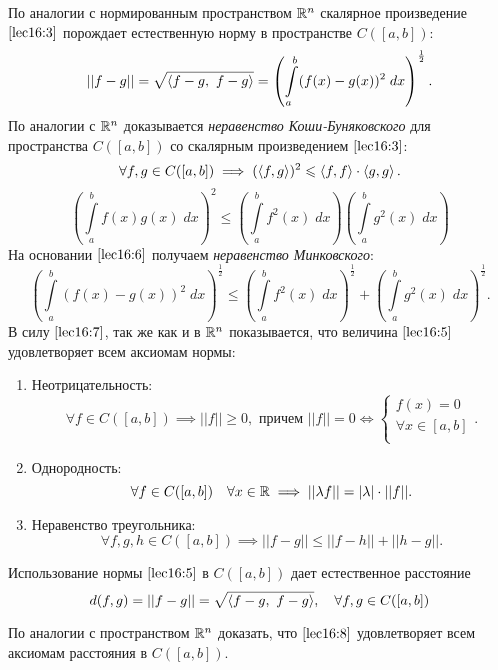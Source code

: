 \documentclass[../../main.tex]{subfiles}
\begin{document}
	 По аналогии с нормированным пространством $\mathbb{R}^n$ скалярное произведение
	  $\eqref{lec16:3}$ порождает естественную норму в пространстве $C(\left[a,
	   b\right])$:
	 \begin{equation}
	 \label{lec16:5}
	 ||f - g|| = \sqrt{\left\langle f - g,\ f - g \right\rangle} = \left(\int \limits_a^b (f(x) - 
	 g(x))^2
	  \; dx\right)^\frac{1}{2}.
	 \end{equation}
	 По аналогии с $\mathbb{R}^n$ доказывается \emph{неравенство Коши-Буняковского} для 
	 пространства
	  $C(\left[a, b\right])$ со скалярным произведением $\eqref{lec16:3}$:
	 \[ \forall f, g \in C(\left[a, b\right]) \implies (\left\langle f, g \right\rangle)^2 \leqslant 
	 \left\langle f, f \right\rangle\cdot \left\langle g, g \right\rangle.\]
	 \begin{equation}
	\label{lec16:6}
	 \left(\int\limits_a^bf(x)g(x)\; dx\right)^2 \le \left(\int \limits_a^b
	  f^2(x)\; dx\right)\left(\int \limits_a^b g^2(x)\; dx\right) 
	 \end{equation}
	 На основании $\eqref{lec16:6}$ получаем \emph{неравенство Минковского}:
	 \begin{equation}
	 \label{lec16:7}
	  \left(\int\limits_a^b(f(x) - g(x))^2\; dx\right)^\frac{1}{2} \le \left(\int
	   \limits_a^b f^2(x)\; dx\right)^\frac{1}{2} + \left(\int \limits_a^b 
	   g^2(x)\; dx\right) ^ \frac{1}{2}.
	 \end{equation}
	 В силу $\eqref{lec16:7}$, так же как и в $\mathbb{R}^n$ показывается, что величина
	  $\eqref{lec16:5}$ удовлетворяет всем аксиомам нормы:
	 \begin{enumerate}
	 \item Неотрицательность:
	 \[\forall f \in C(\left[a, b\right]) \implies ||f|| \geq 0, \text{ причем } 
	 ||f|| = 0 \iff \begin{cases}
	 f(x) = 0\\\forall x \in \left[a, b\right]\\
	 \end{cases}.\]
	 	\item Однородность:
	 \[\forall f \in C(\left[a, b\right]) \quad \forall x \in \mathbb{R} \implies 
	 ||\lambda
	  f|| = |\lambda| \cdot ||f||.\]
	 \item Неравенство треугольника:
	 \[\forall f, g, h \in C(\left[a, b\right]) \implies ||f - g|| \leq ||f - h||
	 + ||h - g||.\]
	 	\end{enumerate}
	 Использование нормы $\eqref{lec16:5}$ в $C(\left[a, b\right])$ дает 
	 естественное расстояние
	 \begin{equation}
	 \label{lec16:8}
	 d(f, g) = ||f - g|| = \sqrt{\left\langle f-g,\ f-g \right\rangle}, \quad
	 \forall f, g \in C(\left[a, b\right])
	 \end{equation}
	 \begin{exc}
	 По аналогии с пространством $\mathbb{R}^n$ доказать, что
	 $\eqref{lec16:8}$ удовлетворяет всем аксиомам расстояния в $C(\left[a, 
	 b\right])$.
	 \end{exc}
	
\end{document}

